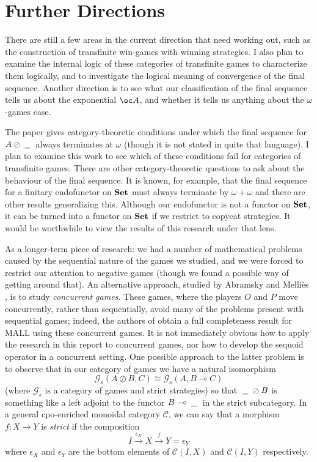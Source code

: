 \documentclass[11pt]{article} %
\theoremstyle{plain} %
\theoremstyle{definition} %
\theoremstyle{note}
\theoremstyle{exercisestyle}
\newcommand{\catname}[1]{{\normalfont\textbf{#1}}}
\newcommand{\Set}{\catname{Set}}
\newcommand*\from{\colon}
\newcommand{\sequoid}{\oslash}
\renewcommand{\implies}{\multimap}
\newcommand{\G}{\mathcal G}
\newcommand{\emptyplay}{\epsilon}
\newcommand{\blank}{\;\underline{\hspace{1.5ex}}\;}
\newcommand{\C}{{\mathcal{C}}}
\begin{document}
\section{Further Directions}

There are still a few areas in the current direction that need working out, such as the construction of transfinite win-games with winning strategies.  I also plan to examine the internal logic of these categories of transfinite games to characterize them logically, and to investigate the logical meaning of convergence of the final sequence.  Another direction is to see what our classification of the final sequence tells us about the exponential $\oc A$, and whether it tells us anything about the $\omega$-games case.  

The paper \cite{MelliesCofCommCom} gives category-theoretic conditions under which the final sequence for $A\sequoid\blank$ always terminates at $\omega$ (though it is not stated in quite that language).  I plan to examine this work to see which of these conditions fail for categories of transfinite games.  There are other category-theoretic questions to ask about the behaviour of the final sequence.  It is known, for example, that the final sequence for a finitary endofunctor on $\Set$ must always terminate by $\omega+\omega$ \cite{finalseq} and there are other results generalizing this.  Although our endofunctor is not a functor on $\Set$, it can be turned into a functor on $\Set$ if we restrict to copycat strategies.  It would be worthwhile to view the results of this research under that lens.  

As a longer-term piece of research: we had a number of mathematical problems caused by the sequential nature of the games we studied, and we were forced to restrict our attention to negative games (though we found a possible way of getting around that).  An alternative approach, studied by Abramsky and Melli\`{e}s \cite{AMConcurrent}, is to study \emph{concurrent games}.  These games, where the players $O$ and $P$ move concurrently, rather than sequentially, avoid many of the problems present with sequential games; indeed, the authors of \cite{AMConcurrent} obtain a full completeness result for MALL using these concurrent games.  It is not immediately obvious how to apply the research in this report to concurrent games, nor how to develop the sequoid operator in a concurrent setting.  One possible approach to the latter problem is to observe that in our category of games we have a natural isomorphism
\[
  \G_s(A\sequoid B,C)\cong\G_s(A,B\implies C)
  \]
(where $\G_s$ is a category of games and strict strategies) so that $\blank\sequoid B$ is something like a left adjoint to the functor $B\implies\blank$ in the strict subcategory.  In a general cpo-enriched monoidal category $\C$, we can say that a morphism $f\from X\to Y$ is \emph{strict} if the composition
\[
  I\xrightarrow{\emptyplay_X}X\xrightarrow{f}Y = \emptyplay_Y
  \]
where $\emptyplay_X$ and $\emptyplay_Y$ are the bottom elements of $\C(I,X)$ and $\C(I,Y)$ respectively.  
\end{document}
